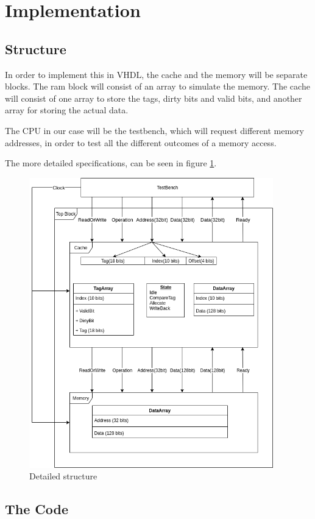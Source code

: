\documentclass{article}
\begin{document}
\section{Implementation}
\subsection{Structure}
In order to implement this in VHDL, the cache and the memory will be separate blocks. The ram block will consist of an array to simulate the memory. The cache will consist of one array to store the tags, dirty bits and valid bits, and another array for storing the actual data.

The CPU in our case will be the testbench, which will request different memory addresses, in order to test all the different outcomes of a memory access.

The more detailed specifications, can be seen in figure \ref{DETAILED}.

\begin{figure}[H]
 \centering
  \includegraphics[width=300pt]{img/OverviewDetailed.png}
 \caption{Detailed structure}
  \label{DETAILED}
 \end{figure}

\subsection{The Code}
\end{document}
